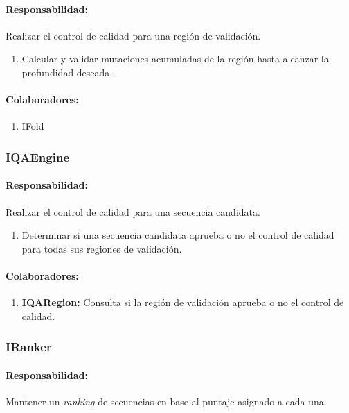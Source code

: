     \paragraph{Responsabilidad:} Realizar el control de calidad para una
regi\'on de validaci\'on.
      \begin{enumerate}
       \item Calcular y validar mutaciones acumuladas de la regi\'on hasta
alcanzar la profundidad deseada.
      \end{enumerate}
    \paragraph{Colaboradores:}
      \begin{enumerate}
       \item IFold
      \end{enumerate}

  \subsubsection{IQAEngine}
    \paragraph{Responsabilidad:} Realizar el control de calidad para una
secuencia candidata.
      \begin{enumerate}             
       \item Determinar si una secuencia candidata aprueba o no el control de
calidad para todas sus regiones de validaci\'on.
      \end{enumerate}
    \paragraph{Colaboradores:}
      \begin{enumerate}
       \item \textbf{IQARegion:} Consulta si la regi\'on de validaci\'on aprueba
o no el control de calidad.
      \end{enumerate}

  \subsubsection{IRanker}
    \paragraph{Responsabilidad:} Mantener un \textit{ranking} de secuencias en
base al puntaje asignado a cada una.    

